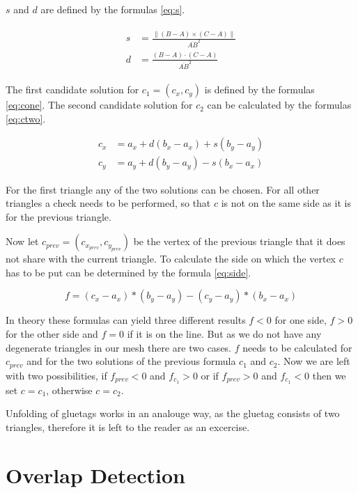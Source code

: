 \documentclass[draft,final]{vutinfth} %
\begin{document}
$s$ and $d$ are defined by the formulas \ref{eq:s}.

\begin{align}
\label{eq:s}
\begin{split}
s &= \frac{\|(B - A)\times(C - A)\|}{\overline{AB}^2}\\
d &= \frac{(B-A)\cdot(C-A)}{\overline{AB}^2}
\end{split}
\end{align}

The first candidate solution for $c_1 = (c_x, c_y)$ is defined by the formulas \ref{eq:cone}. The second candidate solution for $c_2$ can be calculated by the formulas \ref{eq:ctwo}. 

\begin{equation}
\label{eq:ctwo}
\begin{split}
c_x &= a_x + d(b_x - a_x) + s(b_y - a_y)\\
c_y &= a_y + d(b_y - a_y) - s(b_x - a_x)
\end{split}
\end{equation}

For the first triangle any of the two solutions can be chosen. For all other triangles a check needs to be performed, so that $c$ is not on the same side as it is for the previous triangle.


Now let $c_{prev} = (c_{x_{prev}},c_{y_{prev}})$ be the vertex of the previous triangle that it does not share with the current triangle. To calculate the side on which the vertex $c$ has to be put can be determined by the formula \ref{eq:side}.

\begin{equation}
\label{eq:side}
f = (c_x - a_x) * (b_y - a_y) - (c_y - a_y) * (b_x - a_x)
\end{equation}

In theory these formulas can yield three different results $f < 0$ for one side, $f > 0$ for the other side and $f = 0$ if it is on the line. But as we do not have any degenerate triangles in our mesh there are two cases. $f$ needs to be calculated for $c_{prev}$ and for the two solutions of the previous formula $c_1$ and $c_2$. Now we are left with two possibilities, if $f_{prev} < 0$ and $f_{c_1} > 0$ or if $f_{prev} > 0$ and $f_{c_1} < 0$ then we set $c = c_1$, otherwise $c = c_2$.

Unfolding of gluetags works in an analouge way, as the gluetag consists of two triangles, therefore it is left to the reader as an excercise.

\section{Overlap Detection}
\end{document}
